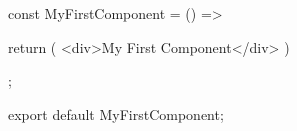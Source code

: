 const MyFirstComponent = () => {
 
  return (
    <div>My First Component</div>
  )
};

export default MyFirstComponent;
